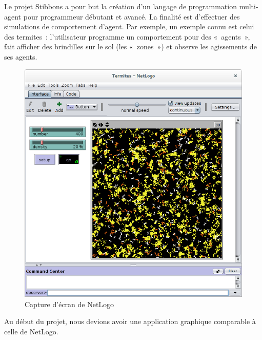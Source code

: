 
Le projet Stibbons a pour but la création d'un langage de programmation multi-agent pour programmeur débutant et avancé.
La finalité est d'effectuer des simulations de comportement d'agent. Par exemple, un exemple connu est celui des termites~: l'utilisateur programme un comportement pour des «~agents~», fait afficher des brindilles sur le sol (les «~zones~») et observe les agissements de ses agents.

\begin{figure}[h]
\centering
\includegraphics[scale=0.3]{doc/gestionProjet/netlogo-termites.png}
\caption{\label{netlogo-termites} Capture d'écran de NetLogo}
\end{figure}

Au début du projet, nous devions avoir une application graphique comparable à celle de NetLogo.

